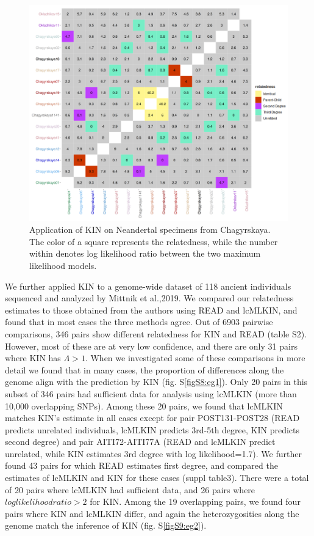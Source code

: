 \documentclass[12pt, letterpaper]{article}
\begin{document}
\begin{figure}[h!]
    \includegraphics[width=18cm]{plots/inkscape_finalImg/kinplot.png}
    \centering
    \caption{Application of KIN on Neandertal specimens from Chagyrskaya. The color of a square represents the relatedness, while the number within denotes log likelihood ratio between the two maximum likelihood models.}
    \label{fig5:Chagyrskaya_KIN}
\end{figure}

We further applied KIN to a genome-wide dataset of 118 ancient individuals sequenced and analyzed by Mittnik et al.,2019. We compared our relatedness estimates to those obtained from the authors using READ and lcMLKIN, and found that in most cases the three methods agree. Out of 6903 pairwise comparisons, 346 pairs show different relatedness for KIN and READ (table S2). However, most of these are at very low confidence, and there are only 31 pairs where KIN has $\Lambda >1$. When we investigated some of these comparisons in more detail we found that in many cases, the proportion of differences along the genome align with the prediction by KIN (fig. S\ref{figS8:eg1}). Only 20 pairs in this subset of 346 pairs had sufficient data for analysis using lcMLKIN (more than 10,000 overlapping SNPs). Among these 20 pairs, we found that lcMLKIN matches KIN's estimate in all cases except for pair POST131-POST28 (READ predicts unrelated individuals, lcMLKIN predicts 3rd-5th degree, KIN predicts second degree) and pair AITI72-AITI77A (READ and lcMLKIN predict unrelated, while KIN estimates 3rd degree with log likelihood=1.7).  
We further found 43 pairs for which READ estimates first degree, and compared the estimates of lcMLKIN and KIN for these cases (suppl table3). There were a total of 20 pairs where lcMLKIN had sufficient data, and 26 pairs where $loglikelihood ratio>2$ for KIN. Among the 19 overlapping pairs, we found four pairs where KIN and lcMLKIN differ, and again the heterozygosities along the genome match the inference of KIN (fig. S\ref{figS9:eg2}).  
\end{document}
